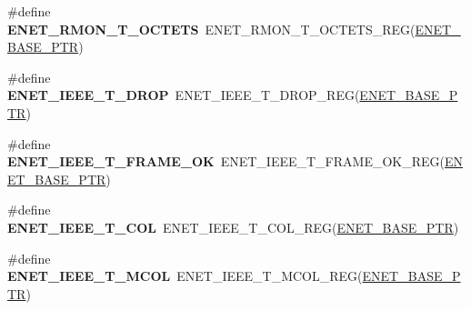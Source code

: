 \begin{DoxyCompactItemize}
\item 
\hypertarget{group___e_n_e_t___register___accessor___macros_gaafd6ce228ef03e734d1f2fa83d19d37c}{}\#define {\bfseries E\+N\+E\+T\+\_\+\+R\+M\+O\+N\+\_\+\+T\+\_\+\+O\+C\+T\+E\+T\+S}~E\+N\+E\+T\+\_\+\+R\+M\+O\+N\+\_\+\+T\+\_\+\+O\+C\+T\+E\+T\+S\+\_\+\+R\+E\+G(\hyperlink{group___e_n_e_t___peripheral_gab64a2d991cc2bd76dd55ee25a52dcb5c}{E\+N\+E\+T\+\_\+\+B\+A\+S\+E\+\_\+\+P\+T\+R})\label{group___e_n_e_t___register___accessor___macros_gaafd6ce228ef03e734d1f2fa83d19d37c}

\item 
\hypertarget{group___e_n_e_t___register___accessor___macros_ga8ae049d1d1c7c61611a6f6ddcf760e96}{}\#define {\bfseries E\+N\+E\+T\+\_\+\+I\+E\+E\+E\+\_\+\+T\+\_\+\+D\+R\+O\+P}~E\+N\+E\+T\+\_\+\+I\+E\+E\+E\+\_\+\+T\+\_\+\+D\+R\+O\+P\+\_\+\+R\+E\+G(\hyperlink{group___e_n_e_t___peripheral_gab64a2d991cc2bd76dd55ee25a52dcb5c}{E\+N\+E\+T\+\_\+\+B\+A\+S\+E\+\_\+\+P\+T\+R})\label{group___e_n_e_t___register___accessor___macros_ga8ae049d1d1c7c61611a6f6ddcf760e96}

\item 
\hypertarget{group___e_n_e_t___register___accessor___macros_ga321b9547e8c7a8dd69206b0d86ba917b}{}\#define {\bfseries E\+N\+E\+T\+\_\+\+I\+E\+E\+E\+\_\+\+T\+\_\+\+F\+R\+A\+M\+E\+\_\+\+O\+K}~E\+N\+E\+T\+\_\+\+I\+E\+E\+E\+\_\+\+T\+\_\+\+F\+R\+A\+M\+E\+\_\+\+O\+K\+\_\+\+R\+E\+G(\hyperlink{group___e_n_e_t___peripheral_gab64a2d991cc2bd76dd55ee25a52dcb5c}{E\+N\+E\+T\+\_\+\+B\+A\+S\+E\+\_\+\+P\+T\+R})\label{group___e_n_e_t___register___accessor___macros_ga321b9547e8c7a8dd69206b0d86ba917b}

\item 
\hypertarget{group___e_n_e_t___register___accessor___macros_gae66d0c804b174cf33bec1d515ea032e8}{}\#define {\bfseries E\+N\+E\+T\+\_\+\+I\+E\+E\+E\+\_\+\+T\+\_\+C\+O\+L}~E\+N\+E\+T\+\_\+\+I\+E\+E\+E\+\_\+\+T\+\_\+C\+O\+L\+\_\+\+R\+E\+G(\hyperlink{group___e_n_e_t___peripheral_gab64a2d991cc2bd76dd55ee25a52dcb5c}{E\+N\+E\+T\+\_\+\+B\+A\+S\+E\+\_\+\+P\+T\+R})\label{group___e_n_e_t___register___accessor___macros_gae66d0c804b174cf33bec1d515ea032e8}

\item 
\hypertarget{group___e_n_e_t___register___accessor___macros_gad96c85c312dbc71abf1716be0e465139}{}\#define {\bfseries E\+N\+E\+T\+\_\+\+I\+E\+E\+E\+\_\+\+T\+\_\+\+M\+C\+O\+L}~E\+N\+E\+T\+\_\+\+I\+E\+E\+E\+\_\+\+T\+\_\+\+M\+C\+O\+L\+\_\+\+R\+E\+G(\hyperlink{group___e_n_e_t___peripheral_gab64a2d991cc2bd76dd55ee25a52dcb5c}{E\+N\+E\+T\+\_\+\+B\+A\+S\+E\+\_\+\+P\+T\+R})\label{group___e_n_e_t___register___accessor___macros_gad96c85c312dbc71abf1716be0e465139}


\end{DoxyCompactItemize}
